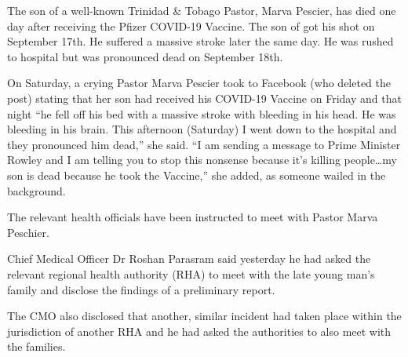 The son of a well-known Trinidad \& Tobago Pastor, Marva Pescier, has died one
day after receiving the Pfizer COVID-19 Vaccine. The son of got his shot on
September 17th. He suffered a massive stroke later the same day. He was rushed
to hospital but was pronounced dead on September 18th.

On Saturday, a crying Pastor Marva Pescier took to Facebook (who deleted the
post) stating that her son had received his COVID-19 Vaccine on Friday and that
night “he fell off his bed with a massive stroke with bleeding in his head. He
was bleeding in his brain. This afternoon (Saturday) I went down to the hospital
and they pronounced him dead,” she said. “I am sending a message to Prime
Minister Rowley and I am telling you to stop this nonsense because it’s killing
people…my son is dead because he took the Vaccine,” she added, as someone wailed
in the background.

The relevant health officials have been instructed to meet with Pastor Marva
Peschier.

Chief Medical Officer Dr Roshan Parasram said yesterday he had asked the
relevant regional health authority (RHA) to meet with the late young man’s
family and disclose the findings of a preliminary report.

The CMO also disclosed that another, similar incident had taken place within the
jurisdiction of another RHA and he had asked the authorities to also meet with
the families.

